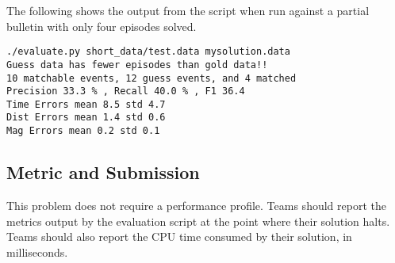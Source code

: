 \documentclass[12pt,letterpaper,onecolumn,oneside]{article}
\begin{document}
The following shows the output from the script when run against a
partial bulletin with only four episodes solved.
\begin{verbatim}
./evaluate.py short_data/test.data mysolution.data
Guess data has fewer episodes than gold data!!
10 matchable events, 12 guess events, and 4 matched
Precision 33.3 % , Recall 40.0 % , F1 36.4
Time Errors mean 8.5 std 4.7
Dist Errors mean 1.4 std 0.6
Mag Errors mean 0.2 std 0.1
\end{verbatim}

\subsection{Metric and Submission}

This problem does not require a performance profile. Teams should report
the metrics output by the evaluation script at the point where their
solution halts. Teams should also report the CPU time consumed by their
solution, in milliseconds.
\end{document}
